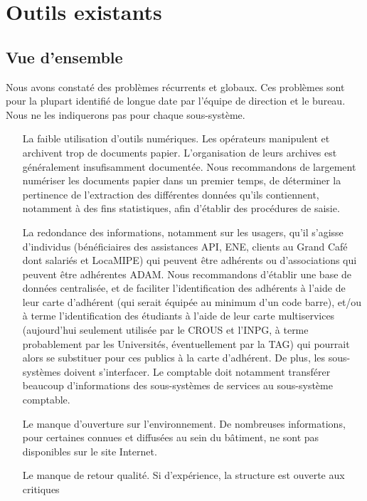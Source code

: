 \section{Outils existants}
\subsection{Vue d'ensemble}
\label{general}

Nous avons constaté des problèmes récurrents et globaux. Ces problèmes sont pour
la plupart identifié de longue date par l'équipe de direction et le bureau. Nous
ne les indiquerons pas pour chaque sous-système.

\begin{enumerate}
\item[La faible utilisation d'outils numériques.] Les opérateurs manipulent et archivent
      trop de documents papier.
      L'organisation de leurs archives est généralement insufisamment documentée.
      Nous recommandons de largement numériser les documents papier dans un premier temps,
      de déterminer la pertinence de l'extraction des différentes données qu'ils contiennent,
      notamment à des fins statistiques, afin d'établir des procédures de saisie.
\item[La redondance des informations,] notamment sur les usagers, qu'il s'agisse d'individus
      (bénéficiaires des assistances API, ENE, clients au Grand Café dont salariés et LocaMIPE)
      qui peuvent être adhérents ou d'associations qui peuvent être adhérentes ADAM.
      Nous recommandons d'établir une base de données centralisée, et de faciliter l'identification
      des adhérents à l'aide de leur carte d'adhérent (qui serait équipée au minimum d'un code barre),
      et/ou à terme l'identification des étudiants à l'aide de leur carte multiservices
      (aujourd'hui seulement utilisée par le CROUS et l'INPG, à terme probablement
      par les Universités, éventuellement par la TAG) qui pourrait alors se substituer
      pour ces publics à la carte d'adhérent.
      De plus, les sous-systèmes doivent s'interfacer. Le comptable doit notamment transférer
      beaucoup d'informations des sous-systèmes de services au sous-système comptable.
\item[Le manque d'ouverture sur l'environnement.] De nombreuses informations, pour certaines
      connues et diffusées au sein du bâtiment, ne sont pas disponibles sur le site Internet.
\item[Le manque de retour qualité.] Si d'expérience, la structure est ouverte aux critiques

\end{enumerate}
